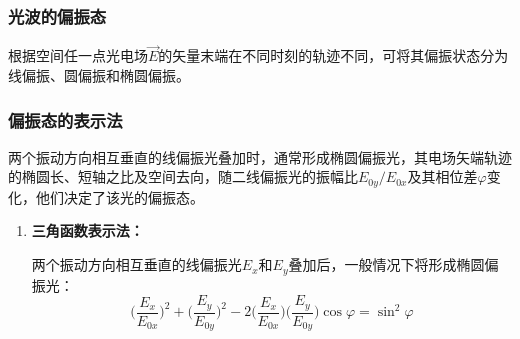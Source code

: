 \documentclass[cn,10pt,chinesefont=founder,math=mtpro2,cite=super,toc=onecol,twoside,openany]{elegantbook}
\begin{document}
\subsubsection{光波的偏振态}
根据空间任一点光电场$\vec E$的矢量末端在不同时刻的轨迹不同，可将其偏振状态分为线偏振、圆偏振和椭圆偏振。
\subsubsection{偏振态的表示法}
两个振动方向相互垂直的线偏振光叠加时，通常形成椭圆偏振光，其电场矢端轨迹的椭圆长、短轴之比及空间去向，随二线偏振光的振幅比$E_{0y}/E_{0x}$及其相位差$\varphi$变化，他们决定了该光的偏振态。
\begin{enumerate}
	\item \textbf{三角函数表示法：}

	两个振动方向相互垂直的线偏振光$E_x$和$E_y$叠加后，一般情况下将形成椭圆偏振光：
	\begin{equation}
	\bigg(\frac{E_x}{E_{0x}}\bigg)^2+\bigg(\frac{E_y}{E_{0y}}\bigg)^2-2\bigg(\frac{E_x}{E_{0x}}\bigg)\bigg(\frac{E_y}{E_{0y}}\bigg)\cos\varphi=\sin^2\varphi
	\end{equation}
\end{enumerate}
\end{document}
